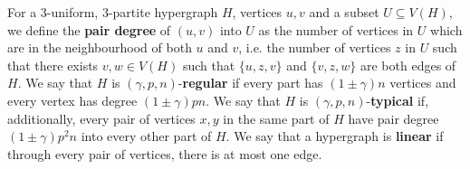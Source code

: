 \documentclass[a4paper,11pt,hidelinks]{amsart}
\theoremstyle{definition}
\newcommand{\AM}[1]{\textcolor{blue}{[#1]}}
\begin{document}

 For a $3$-uniform, $3$-partite hypergraph $H$, vertices $u,v$ and a subset $U\subseteq V(H)$, we define the \textbf{pair degree} of $(u,v)$ into $U$ as the number of vertices in $U$ which are in the neighbourhood of both $u$ and $v$, i.e. the number of vertices $z$ in $U$ such that there exists $v,w\in V(H)$ such that $\{u,z,v\}$ and $\{v,z,w\}$ are both edges of $H$. We say that $H$ is $(\gamma, p, n)$-\textbf{regular} if every part has $(1\pm \gamma)n$ vertices and every vertex has degree  $(1\pm \gamma)pn$. We say that $H$ is $(\gamma, p, n)$-\textbf{typical} if, additionally, every pair of vertices $x,y$ in the same part of $H$ have pair degree  $(1\pm \gamma)p^2n$ into every other part of $H$. We say that a hypergraph is \textbf{linear} if through every pair of vertices, there is at most one edge.
\end{document}

